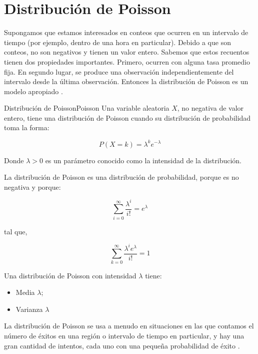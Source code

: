 

\section{Distribución de Poisson}

Supongamos que estamos interesados en conteos que ocurren en un intervalo de
tiempo (por ejemplo, dentro de una hora en particular). Debido a que son
conteos, no son negativos y tienen un valor entero. Sabemos que estos recuentos
tienen dos propiedades importantes. Primero, ocurren con alguna tasa promedio
fija. En segundo lugar, se produce una observación independientemente del
intervalo desde la última observación. Entonces la distribución de Poisson es un
modelo apropiado \cite{forsyth2018probability}.

\begin{theorem}{Distribución de Poisson}{Poisson}
Una variable aleatoria $X$, no negativa de valor entero, tiene una distribución de
Poisson cuando su distribución de probabilidad toma la forma:

\begin{equation}
    P({X=k})=\lambda^k e^{-\lambda}
\end{equation}

Donde $\lambda > 0$ es un parámetro conocido como la intensidad de la distribución.
    
\end{theorem}

La distribución de Poisson es una distribución de probabilidad, porque es no
negativa y porque:

\begin{center}
    \[
\sum_{i=0}^{\infty} \frac{\lambda^i}{i!} = e^\lambda
\]
\end{center}

tal que,

\begin{center}
    \[
\sum_{k=0}^{\infty} \frac{\lambda^i e^\lambda}{i!}  = 1
\]
\end{center}

Una distribución de Poisson con intensidad $\lambda$ tiene:

\begin{itemize}
    \item Media $\lambda$;
    \item Varianza $\lambda$
\end{itemize}

La distribución de Poisson se usa a menudo en situaciones en las que contamos el
número de éxitos en una región o intervalo de tiempo en particular, y hay una
gran cantidad de intentos, cada uno con una pequeña probabilidad de éxito
\cite{blitzstein2015introduction}.

